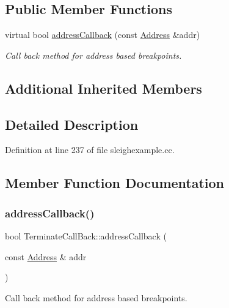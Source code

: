 \subsection*{Public Member Functions}
\begin{DoxyCompactItemize}
\item 
virtual bool \mbox{\hyperlink{class_terminate_call_back_a5e6e9e130ebb01d929d70022069da60e}{address\+Callback}} (const \mbox{\hyperlink{class_address}{Address}} \&addr)
\begin{DoxyCompactList}\small\item\em Call back method for address based breakpoints. \end{DoxyCompactList}\end{DoxyCompactItemize}
\subsection*{Additional Inherited Members}


\subsection{Detailed Description}


Definition at line 237 of file sleighexample.\+cc.



\subsection{Member Function Documentation}
\mbox{\label{class_terminate_call_back_a5e6e9e130ebb01d929d70022069da60e}} 
\subsubsection{\texorpdfstring{addressCallback()}{addressCallback()}}
{\footnotesize\ttfamily bool Terminate\+Call\+Back\+::address\+Callback (\begin{DoxyParamCaption}\item[{const \mbox{\hyperlink{class_address}{Address}} \&}]{addr }\end{DoxyParamCaption})\hspace{0.3cm}{\ttfamily [virtual]}}



Call back method for address based breakpoints. 

